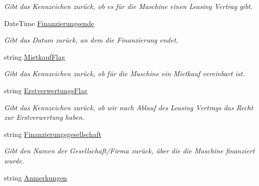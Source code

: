 \begin{DoxyCompactItemize}
\begin{DoxyCompactList}\small\item\em Gibt das Kennzeichen zurück, ob es für die Maschine einen Leasing Vertrag gibt. \end{DoxyCompactList}\item 
Date\+Time \hyperlink{class_products_1_1_model_1_1_entities_1_1_kundenmaschine_a6e9a28482b4e1d9d2b9fa2967866317e}{Finanzierungsende}
\begin{DoxyCompactList}\small\item\em Gibt das Datum zurück, an dem die Finanzierung endet. \end{DoxyCompactList}\item 
string \hyperlink{class_products_1_1_model_1_1_entities_1_1_kundenmaschine_a4d68b1b90ecca9a8028e5eb6a79f790e}{Mietkauf\+Flag}
\begin{DoxyCompactList}\small\item\em Gibt das Kennzeichen zurück, ob für die Maschine ein Mietkauf vereinbart ist. \end{DoxyCompactList}\item 
string \hyperlink{class_products_1_1_model_1_1_entities_1_1_kundenmaschine_a2c4c3d78e2e75c12f82cc10e2eaa49e0}{Erstverwertungs\+Flag}
\begin{DoxyCompactList}\small\item\em Gibt das Kennzeichen zurück, ob wir nach Ablauf des Leasing Vertrags das Recht zur Erstverwertung haben. \end{DoxyCompactList}\item 
string \hyperlink{class_products_1_1_model_1_1_entities_1_1_kundenmaschine_a005ebd49380b95416dfad3eb5ce822df}{Finanzierungsgesellschaft}
\begin{DoxyCompactList}\small\item\em Gibt den Namen der Gesellschaft/\+Firma zurück, über die die Maschine finanziert wurde. \end{DoxyCompactList}\item 
string \hyperlink{class_products_1_1_model_1_1_entities_1_1_kundenmaschine_ab46136495c9908ce64153e33c261f756}{Anmerkungen}

\end{DoxyCompactItemize}
